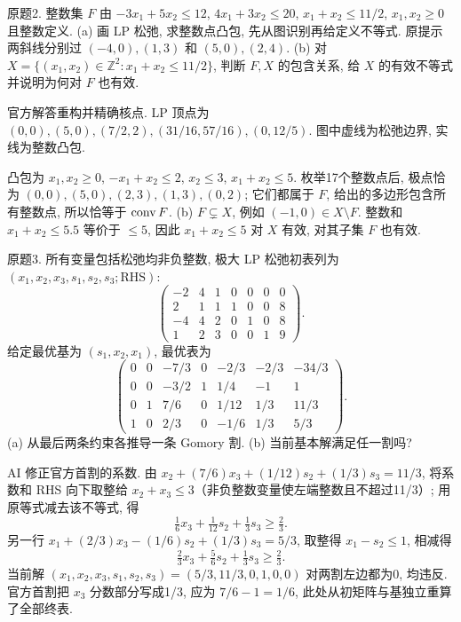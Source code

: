 \begin{exercise}\label{ass:15053-rec8-q2}
原题2. 整数集 $F$ 由 $-3x_1+5x_2\le12$, $4x_1+3x_2\le20$, $x_1+x_2\le11/2$, $x_1,x_2\ge0$ 且整数定义.
(a) 画 LP 松弛, 求整数点凸包, 先从图识别再给定义不等式. 原提示两斜线分别过 $(-4,0),(1,3)$ 和 $(5,0),(2,4)$.
(b) 对 $X=\{(x_1,x_2)\in\mathbb Z^2:x_1+x_2\le11/2\}$, 判断 $F,X$ 的包含关系, 给 $X$ 的有效不等式并说明为何对 $F$ 也有效.
\end{exercise}
\begin{solution}
官方解答重构并精确核点. LP 顶点为 $(0,0),(5,0),(7/2,2),(31/16,57/16),(0,12/5)$. 图中虚线为松弛边界, 实线为整数凸包.
\begin{center}\end{center}
凸包为 $x_1,x_2\ge0$, $-x_1+x_2\le2$, $x_2\le3$, $x_1+x_2\le5$. 枚举17个整数点后, 极点恰为 $(0,0),(5,0),(2,3),(1,3),(0,2)$; 它们都属于 $F$, 给出的多边形包含所有整数点, 所以恰等于 $\operatorname{conv} F$. (b) $F\subsetneq X$, 例如 $(-1,0)\in X\setminus F$. 整数和 $x_1+x_2\le5.5$ 等价于 $\le5$, 因此 $x_1+x_2\le5$ 对 $X$ 有效, 对其子集 $F$ 也有效.
\end{solution}

\begin{exercise}\label{ass:15053-rec8-q3}
原题3. 所有变量包括松弛均非负整数, 极大 LP 松弛初表列为 $(x_1,x_2,x_3,s_1,s_2,s_3;\mathrm{RHS})$:
\[
\begin{pmatrix}-2&4&1&0&0&0&0\\2&1&1&1&0&0&8\\-4&4&2&0&1&0&8\\1&2&3&0&0&1&9\end{pmatrix}.
\]
给定最优基为 $(s_1,x_2,x_1)$, 最优表为
\[
\begin{pmatrix}0&0&-7/3&0&-2/3&-2/3&-34/3\\0&0&-3/2&1&1/4&-1&1\\0&1&7/6&0&1/12&1/3&11/3\\1&0&2/3&0&-1/6&1/3&5/3\end{pmatrix}.
\]
(a) 从最后两条约束各推导一条 Gomory 割. (b) 当前基本解满足任一割吗?
\end{exercise}
\begin{solution}
AI 修正官方首割的系数. 由 $x_2+(7/6)x_3+(1/12)s_2+(1/3)s_3=11/3$, 将系数和 RHS 向下取整给 $x_2+x_3\le3$（非负整数变量使左端整数且不超过11/3）; 用原等式减去该不等式, 得
\[
\tfrac16x_3+\tfrac1{12}s_2+\tfrac13s_3\ge\tfrac23.
\]
另一行 $x_1+(2/3)x_3-(1/6)s_2+(1/3)s_3=5/3$, 取整得 $x_1-s_2\le1$, 相减得
\[
\tfrac23x_3+\tfrac56s_2+\tfrac13s_3\ge\tfrac23.
\]
当前解 $(x_1,x_2,x_3,s_1,s_2,s_3)=(5/3,11/3,0,1,0,0)$ 对两割左边都为0, 均违反. 官方首割把 $x_3$ 分数部分写成1/3, 应为 $7/6-1=1/6$, 此处从初矩阵与基独立重算了全部终表.
\end{solution}

